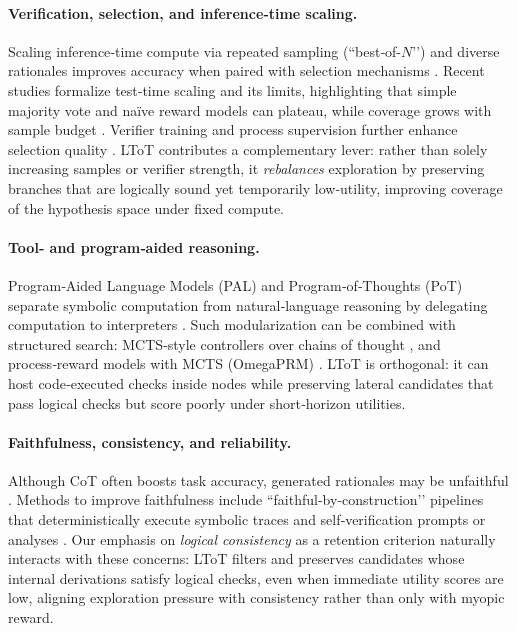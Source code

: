 \documentclass{article}
\begin{document}
\paragraph{Verification, selection, and inference‑time scaling.}
Scaling inference‑time compute via repeated sampling (“best‑of-\(N\)’’) and diverse rationales improves accuracy when paired with selection mechanisms \citep{cobbe2021verifier,wang2022selfconsistency}. Recent studies formalize test‑time scaling and its limits, highlighting that simple majority vote and naïve reward models can plateau, while coverage grows with sample budget \citep{brown2024monkeys}. Verifier training and process supervision further enhance selection quality \citep{lightman2023verify,zhang2024generativeverifiers}. LToT contributes a complementary lever: rather than solely increasing samples or verifier strength, it \emph{rebalances} exploration by preserving branches that are logically sound yet temporarily low‑utility, improving coverage of the hypothesis space under fixed compute.

\paragraph{Tool‑ and program‑aided reasoning.}
Program‑Aided Language Models (PAL) and Program‑of‑Thoughts (PoT) separate symbolic computation from natural‑language reasoning by delegating computation to interpreters \citep{gao2022pal,chen2022pot}. Such modularization can be combined with structured search: MCTS‑style controllers over chains of thought \citep{xie2024mcts}, and process‑reward models with MCTS (OmegaPRM) \citep{luo2024omegaprm}. LToT is orthogonal: it can host code‑executed checks inside nodes while preserving lateral candidates that pass logical checks but score poorly under short‑horizon utilities.

\paragraph{Faithfulness, consistency, and reliability.}
Although CoT often boosts task accuracy, generated rationales may be unfaithful \citep{turpin2023dontsaysay,lanham2023measurefaithfulness}. Methods to improve faithfulness include “faithful‑by‑construction’’ pipelines that deterministically execute symbolic traces \citep{lyu2023faithfulcot} and self‑verification prompts or analyses \citep{weng2022selfverification}. Our emphasis on \emph{logical consistency} as a retention criterion naturally interacts with these concerns: LToT filters and preserves candidates whose internal derivations satisfy logical checks, even when immediate utility scores are low, aligning exploration pressure with consistency rather than only with myopic reward.
\end{document}
